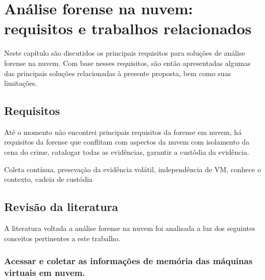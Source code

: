 \documentclass[
	12pt,				%
	openright,			%
	oneside,			%
	a4paper,			%
	english,			%
	brazil,				%
	]{abntex2}
\newcommand{\marcos}[1]{{\color{blue}{MARCOS: #1}}}
\begin{document}
\chapter{Análise forense na nuvem: requisitos e trabalhos relacionados}
\label{chp:contexto}

Neste capítulo são discutidos os principais requisitos para soluções de análise forense na nuvem.
Com base nesses requisitos, são então apresentadas algumas das principais soluções relacionadas à presente proposta, bem como suas limitações.

\section{Requisitos}
\label{chp:contexto-requisitos}

\marcos{Discuta aqui as métricas que você vai utilizar para a comparação e o porquê delas serem relevantes. Isso define os requisitos para soluções relacionadas, e permite você analisá-las e justificar a sua solução.}
Até o momento não encontrei principais requisitos da forense em nuvem, há requisitos da forense que conflitam com aspectos da nuvem com isolamento da cena do crime, catalogar
todas as evidências, garantir a custôdia da evidência.

Coleta contínua, presevação da evidência volátil, independência de VM, conhece o contexto, cadeia de custódia

\section{Revisão da literatura}
\label{chp:contexto-revisao}

A literatura voltada a análise forense na nuvem foi analisada a luz dos seguintes conceitos pertinentes a este trabalho. 

\subsection{Acessar e coletar as informações de memória das máquinas virtuais em nuvem.}
\label{chp:coleta-revisao}
\end{document}
